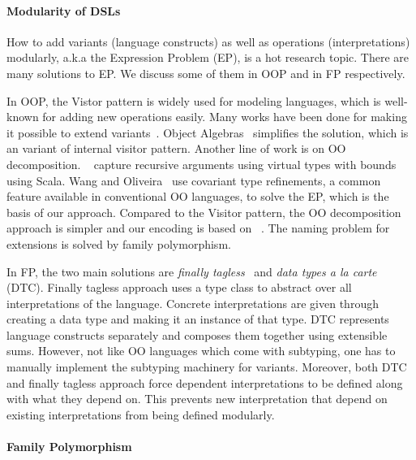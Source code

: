 \paragraph{Modularity of DSLs}
How to add variants (language constructs) as well as operations
(interpretations) modularly, a.k.a the Expression Problem (EP), is a hot research
topic. There are many solutions to EP. We discuss some of them in
OOP and in FP respectively.

In OOP, the Vistor pattern is widely used for modeling languages, which is
well-known for adding new operations easily. Many works
have been done for making it possible to extend variants~\cite{oliveira07genericity,oliveira09modular}.
Object Algebras~\cite{bruno12oa} simplifies the solution, which is an variant of
internal visitor pattern.
Another line of work is on OO decomposition. ~\cite{zenger05independentlyextensible} capture recursive
arguments using virtual types with bounds using Scala. Wang and Oliveira~\cite{eptrivially16}
use covariant type refinements, a common feature available in conventional OO
languages, to solve the EP, which is the basis of our approach.
Compared to the Visitor pattern, the OO decomposition approach is simpler and
our encoding is based on ~\cite{eptrivially16}. The
naming problem for extensions is solved by family polymorphism.

In FP, the two main solutions are \emph{finally
  tagless}~\cite{carette2009finally} and \emph{data types a la
  carte}~\cite{swierstra2008data} (DTC).
Finally tagless approach uses a type class to abstract over all interpretations
of the language. Concrete interpretations are given through creating a data type and
making it an instance of that type.
DTC represents language constructs separately and composes them together using
extensible sums. However, not like OO languages which come with subtyping, one
has to manually implement the subtyping machinery for variants.
Moreover, both DTC and finally tagless approach force dependent interpretations
to be defined along with what they depend on.
This prevents new interpretation that depend on existing interpretations from
being defined modularly.

\paragraph{Family Polymorphism}

